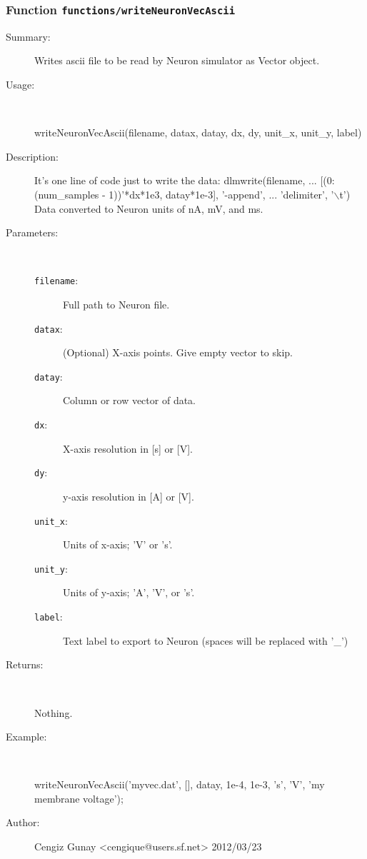 \subsubsection[Function \texttt{writeNeuronVecAscii}]{Function \texttt{functions/writeNeuronVecAscii}}%
%
\label{ref_functions__writeNeuronVecAscii}%
\hypertarget{ref_functions__writeNeuronVecAscii}{}%
\begin{description}
\item[Summary:]Writes ascii file to be read by Neuron simulator as Vector object.
%
\item[Usage:]~%
\begin{lyxcode}%
writeNeuronVecAscii(filename, datax, datay, dx, dy, unit\_x, unit\_y, label)
%
\end{lyxcode}%
%
\item[Description:]%
It's one line of code just to write the data: 
 dlmwrite(filename, ...
         [(0:(num\_samples - 1))'*dx*1e3, datay*1e-3], '-append', ...
         'delimiter', '$\backslash$t')
 Data converted to Neuron units of nA, mV, and ms.
\item[Parameters:]~
\begin{description}%
\item[\texttt{filename}:]
 Full path to Neuron file.
\item[\texttt{datax}:]
 (Optional) X-axis points. Give empty vector to skip.
\item[\texttt{datay}:]
 Column or row vector of data.
\item[\texttt{dx}:]
 X-axis resolution in [s] or [V].
\item[\texttt{dy}:]
 y-axis resolution in [A] or [V].
\item[\texttt{unit\_x}:]
 Units of x-axis; 'V' or 's'.
\item[\texttt{unit\_y}:]
 Units of y-axis; 'A', 'V', or 's'.
\item[\texttt{label}:]
 Text label to export to Neuron (spaces will be replaced with '\_')
\end{description}%
%
\item[Returns:
]~

   Nothing.
%
\item[Example:]~
\begin{lyxcode}   writeNeuronVecAscii('myvec.dat', [], datay, 1e-4, 1e-3, 's', 'V', 'my membrane voltage');
\\%
\end{lyxcode}
%
%
\item[Author:]%
Cengiz Gunay <cengique@users.sf.net> 2012/03/23
%
\end{description}
\methodline%

